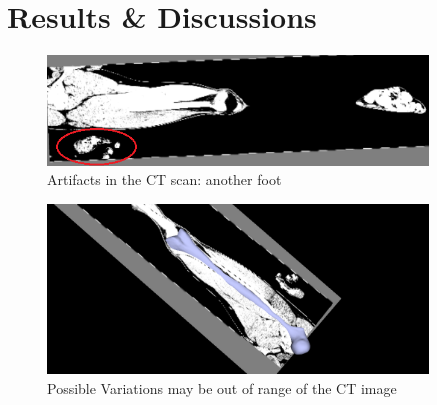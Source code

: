 \documentclass{article}
\begin{document}
	\section{Results \& Discussions}
		\begin{figure}
			\centering
			\includegraphics[width=0.9\textwidth]{images/CT_10_foot.png}
			\caption{Artifacts in the CT scan: another foot}
			\label{2.1}
		\end{figure}		
		\begin{figure}
			\centering
			\includegraphics[width=0.9\textwidth]{images/segmentation_10_outofrange.png}
			\caption{Possible Variations may be out of range of the CT image}
			\label{2.2}
		\end{figure}
	
\end{document}
